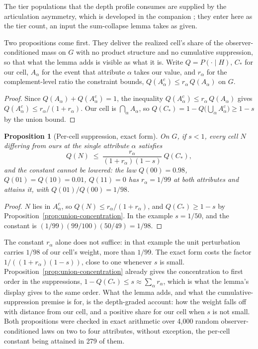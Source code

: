 \documentclass[11pt]{article}
\newtheorem{proposition}{Proposition}
\theoremstyle{definition}
\begin{document}
The tier populations that the depth profile consumes are supplied by the articulation asymmetry, which is developed in the companion \cite{Nexus}; they enter here as the tier count, an input the sum-collapse lemma takes as given.



\noindent Two propositions come first. They deliver the realized cell's share of the observer-conditioned mass on $G$ with no product structure and no cumulative suppression, so that what the lemma adds is visible as what it is. Write $Q = P(\cdot \mid H)$, $C_\ast$ for our cell, $A_\alpha$ for the event that attribute $\alpha$ takes our value, and $r_\alpha$ for the complement-level ratio the constraint bounds, $Q(A_\alpha^{c}) \le r_\alpha\, Q(A_\alpha)$ on $G$.



\begin{proof}
Since $Q(A_\alpha) + Q(A_\alpha^{c}) = 1$, the inequality $Q(A_\alpha^{c}) \le r_\alpha\, Q(A_\alpha)$ gives $Q(A_\alpha^{c}) \le r_\alpha/(1+r_\alpha)$. Our cell is $\bigcap_\alpha A_\alpha$, so $Q(C_\ast) = 1 - Q\big(\bigcup_\alpha A_\alpha^{c}\big) \ge 1 - s$ by the union bound.
\end{proof}

\begin{proposition}[Per-cell suppression, exact form]
\label{prop:cell-suppression}
On $G$, if $s < 1$, every cell $N$ differing from ours at the single attribute $\alpha$ satisfies
\begin{equation}
\label{eq:cell-suppression}
Q(N) \;\le\; \frac{r_\alpha}{(1+r_\alpha)(1-s)}\; Q(C_\ast),
\end{equation}
and the constant cannot be lowered: the law $Q(00) = 0.98$, $Q(01) = Q(10) = 0.01$, $Q(11) = 0$ has $r_\alpha = 1/99$ at both attributes and attains it, with $Q(01)/Q(00) = 1/98$.
\end{proposition}
\begin{proof}
$N$ lies in $A_\alpha^{c}$, so $Q(N) \le r_\alpha/(1+r_\alpha)$, and $Q(C_\ast) \ge 1 - s$ by Proposition~\ref{prop:union-concentration}. In the example $s = 1/50$, and the constant is $(1/99)(99/100)(50/49) = 1/98$.
\end{proof}

\noindent The constant $r_\alpha$ alone does not suffice: in that example the unit perturbation carries $1/98$ of our cell's weight, more than $1/99$. The exact form costs the factor $1/((1+r_\alpha)(1-s))$, close to one whenever $s$ is small. Proposition~\ref{prop:union-concentration} already gives the concentration to first order in the suppressions, $1 - Q(C_\ast) \le s \approx \sum_\alpha r_\alpha$, which is what the lemma's display gives to the same order. What the lemma adds, and what the cumulative-suppression premise is for, is the depth-graded account: how the weight falls off with distance from our cell, and a positive share for our cell when $s$ is not small. Both propositions were checked in exact arithmetic over 4{,}000 random observer-conditioned laws on two to four attributes, without exception, the per-cell constant being attained in 279 of them.
\end{document}
